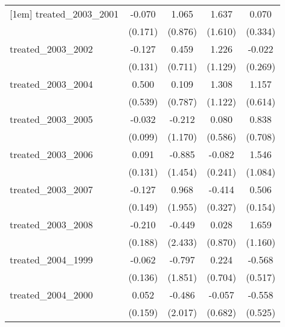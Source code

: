 {\begin{tabular}{l*{4}{c}}
[1em]
treated\_2003\_2001&      -0.070         &       1.065         &       1.637         &       0.070         \\
            &     (0.171)         &     (0.876)         &     (1.610)         &     (0.334)         \\
[1em]
treated\_2003\_2002&      -0.127         &       0.459         &       1.226         &      -0.022         \\
            &     (0.131)         &     (0.711)         &     (1.129)         &     (0.269)         \\
[1em]
treated\_2003\_2004&       0.500         &       0.109         &       1.308         &       1.157         \\
            &     (0.539)         &     (0.787)         &     (1.122)         &     (0.614)         \\
[1em]
treated\_2003\_2005&      -0.032         &      -0.212         &       0.080         &       0.838         \\
            &     (0.099)         &     (1.170)         &     (0.586)         &     (0.708)         \\
[1em]
treated\_2003\_2006&       0.091         &      -0.885         &      -0.082         &       1.546         \\
            &     (0.131)         &     (1.454)         &     (0.241)         &     (1.084)         \\
[1em]
treated\_2003\_2007&      -0.127         &       0.968         &      -0.414         &       0.506\sym{**} \\
            &     (0.149)         &     (1.955)         &     (0.327)         &     (0.154)         \\
[1em]
treated\_2003\_2008&      -0.210         &      -0.449         &       0.028         &       1.659         \\
            &     (0.188)         &     (2.433)         &     (0.870)         &     (1.160)         \\
[1em]
treated\_2004\_1999&      -0.062         &      -0.797         &       0.224         &      -0.568         \\
            &     (0.136)         &     (1.851)         &     (0.704)         &     (0.517)         \\
[1em]
treated\_2004\_2000&       0.052         &      -0.486         &      -0.057         &      -0.558         \\
            &     (0.159)         &     (2.017)         &     (0.682)         &     (0.525)         \\

\end{tabular}}
